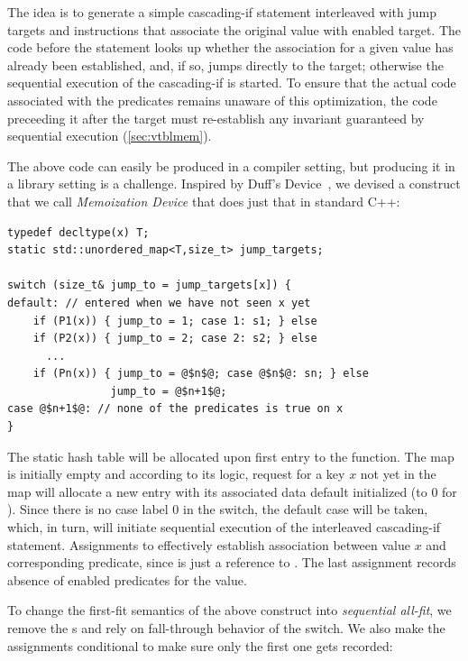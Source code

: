 The idea is to generate a simple cascading-if statement interleaved with jump 
targets and instructions that associate the original value with enabled target. 
The code before the statement looks up whether the association for a given value 
has already been established, and, if so, jumps directly to the target; otherwise 
the sequential execution of the cascading-if is started. To ensure 
that the actual code associated with the predicates remains unaware of this 
optimization, the code preceeding it after the target must re-establish any 
invariant guaranteed by sequential execution (\textsection\ref{sec:vtblmem}).

The above code can easily be produced in a compiler setting, but producing it in 
a library setting is a challenge. Inspired by Duff's Device~\cite{Duff}, 
we devised a construct that we call \emph{Memoization Device} that does just 
that in standard C++:

\begin{lstlisting}
typedef decltype(x) T;
static std::unordered_map<T,size_t> jump_targets;

switch (size_t& jump_to = jump_targets[x]) {
default: // entered when we have not seen x yet
    if (P1(x)) { jump_to = 1; case 1: s1; } else 
    if (P2(x)) { jump_to = 2; case 2: s2; } else
      ...
    if (Pn(x)) { jump_to = @$n$@; case @$n$@: sn; } else
                jump_to = @$n+1$@;
case @$n+1$@: // none of the predicates is true on x
}
\end{lstlisting}

\noindent
The static  hash table will be allocated upon first entry 
to the function. The map is initially empty and according to its logic, 
request for a key $x$ not yet in the map will allocate a 
new entry with its associated data default initialized (to 0 for ). Since 
there is no case label 0 in the switch, the default case will be taken, which, in 
turn, will initiate sequential execution of the interleaved cascading-if 
statement. Assignments to  effectively establish association 
between value $x$ and corresponding predicate, since  is just a 
reference to . The last assignment records absence of 
enabled predicates for the value.

To change the first-fit semantics of the above construct into \emph{sequential 
all-fit}, we remove the s and rely on fall-through behavior of the 
switch. We also make the assignments conditional to make sure only the first one 
gets recorded:

